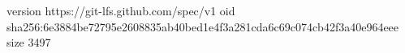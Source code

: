 version https://git-lfs.github.com/spec/v1
oid sha256:6e3884be72795e2608835ab40bed1e4f3a281cda6c69c074cb42f3a40e964eee
size 3497
